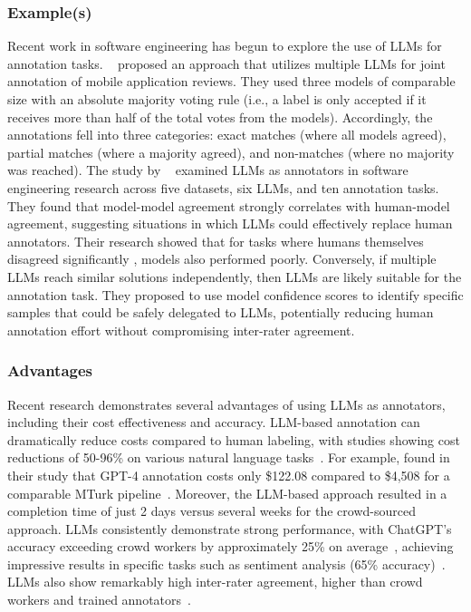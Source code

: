 \subsubsection{Example(s)}
Recent work in software engineering has begun to explore the use of LLMs for annotation tasks.
\citeauthor{Huang2023Enhancing}~\cite{Huang2023Enhancing} proposed an approach that utilizes multiple LLMs for joint annotation of mobile application reviews. 
They used three models of comparable size with an absolute majority voting rule (i.e., a label is only accepted if it receives more than half of the total votes from the models).
Accordingly, the annotations fell into three categories: exact matches (where all models agreed), partial matches (where a majority agreed), and non-matches (where no majority was reached).
The study by \citeauthor{Ahmed2025}~\cite{Ahmed2025} examined LLMs as annotators in software engineering research across five datasets, six LLMs, and ten annotation tasks.
They found that model-model agreement strongly correlates with human-model agreement, suggesting situations in which LLMs could effectively replace human annotators. Their research showed that for tasks where humans themselves disagreed significantly , models also performed poorly.
Conversely, if multiple LLMs reach similar solutions independently, then LLMs are likely suitable for the annotation task.
They proposed to use model confidence scores to identify specific samples that could be safely delegated to LLMs, potentially reducing human annotation effort without compromising inter-rater agreement.

\subsubsection{Advantages}
Recent research demonstrates several advantages of using LLMs as annotators, including their cost effectiveness and accuracy.
LLM-based annotation can dramatically reduce costs compared to human labeling, with studies showing cost reductions of 50-96\% on various natural language tasks~\cite{DBLP:conf/emnlp/WangLXZZ21}.
For example, \citeauthor{DBLP:conf/chi/HeHDRH24} found in their study that GPT-4 annotation costs only \$122.08 compared to \$4,508 for a comparable MTurk pipeline~\cite{DBLP:conf/chi/HeHDRH24}.
Moreover, the LLM-based approach resulted in a completion time of just 2 days versus several weeks for the crowd-sourced approach.
LLMs consistently demonstrate strong performance, with ChatGPT's accuracy exceeding crowd workers by approximately 25\% on average~\cite{DBLP:journals/corr/abs-2303-15056}, achieving impressive results in specific tasks such as sentiment analysis (65\% accuracy)~\cite{DBLP:journals/corr/abs-2304-10145}.
LLMs also show remarkably high inter-rater agreement, higher than crowd workers and trained annotators~\cite{DBLP:journals/corr/abs-2303-15056}.

